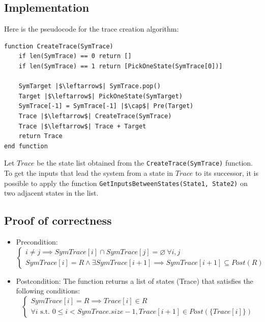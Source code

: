 \documentclass[12pt]{article}
\begin{document}
    \subsection{Implementation}
    Here is the pseudocode for the trace creation algorithm:
    \begin{verbatim}
function CreateTrace(SymTrace)
    if len(SymTrace) == 0 return []
    if len(SymTrace) == 1 return [PickOneState(SymTrace[0])]

    SymTarget |$\leftarrow$| SymTrace.pop()
    Target |$\leftarrow$| PickOneState(SymTarget)
    SymTrace[-1] = SymTrace[-1] |$\cap$| Pre(Target)
    Trace |$\leftarrow$| CreateTrace(SymTrace)
    Trace |$\leftarrow$| Trace + Target
    return Trace
end function
    \end{verbatim}
    Let $Trace$ be the state list obtained from the \texttt{CreateTrace(SymTrace)} function. To get the inputs that lead the system from a state in $Trace$ to its successor, it is possible to apply the function \texttt{GetInputsBetweenStates(State1, State2)} on two adjacent states in the list.
    
    \subsection{Proof of correctness}
    \begin{itemize}
        \item Precondition:
        \begin{equation}
            \begin{cases}
                i \neq j \implies SymTrace[i] \cap SymTrace[j] = \varnothing\ \forall i, j \\
                SymTrace[i] = R \wedge \exists SymTrace[i+1] \implies SymTrace[i+1] \subseteq Post(R)
            \end{cases}
        \end{equation}
        \item Postcondition: The function returns a list of states (Trace) that satisfies the following conditions:
        \begin{equation}
            \begin{cases}
                SymTrace[i] = R \implies Trace[i] \in R \\
                \forall i \mbox{ s.t. } 0 \leq i < SymTrace.size - 1, Trace[i+1] \in Post(\{Trace[i]\})
            \end{cases}
        \end{equation}
    \end{itemize}
\end{document}
